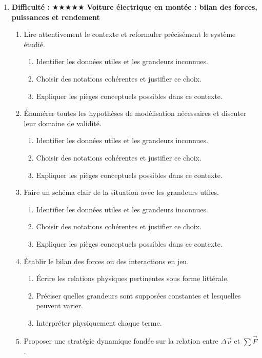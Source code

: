 \documentclass[11pt,a4paper]{article}
\newcommand{\etoiles}[1]{\textbf{Difficulté : }#1}
\begin{document}
\begin{enumerate}[label=\textbf{Très long \arabic*.},leftmargin=*]
\begin{enumerate}[label=\textbf{\arabic*)}]
\end{enumerate}
\item \etoiles{★★★★★}
\textbf{Voiture électrique en montée : bilan des forces, puissances et rendement}
\begin{enumerate}[label=\textbf{\arabic*)}]
\item Lire attentivement le contexte et reformuler précisément le système étudié.
\begin{enumerate}[label=\alph*)]
\item Identifier les données utiles et les grandeurs inconnues.
\item Choisir des notations cohérentes et justifier ce choix.
\item Expliquer les pièges conceptuels possibles dans ce contexte.
\end{enumerate}
\item Énumérer toutes les hypothèses de modélisation nécessaires et discuter leur domaine de validité.
\begin{enumerate}[label=\alph*)]
\item Identifier les données utiles et les grandeurs inconnues.
\item Choisir des notations cohérentes et justifier ce choix.
\item Expliquer les pièges conceptuels possibles dans ce contexte.
\end{enumerate}
\item Faire un schéma clair de la situation avec les grandeurs utiles.
\begin{enumerate}[label=\alph*)]
\item Identifier les données utiles et les grandeurs inconnues.
\item Choisir des notations cohérentes et justifier ce choix.
\item Expliquer les pièges conceptuels possibles dans ce contexte.
\end{enumerate}
\item Établir le bilan des forces ou des interactions en jeu.
\begin{enumerate}[label=\alph*)]
\item Écrire les relations physiques pertinentes sous forme littérale.
\item Préciser quelles grandeurs sont supposées constantes et lesquelles peuvent varier.
\item Interpréter physiquement chaque terme.
\end{enumerate}
\item Proposer une stratégie dynamique fondée sur la relation entre $\Delta\vec v$ et $\sum\vec F$.

\end{enumerate}
\end{enumerate}
\end{document}
